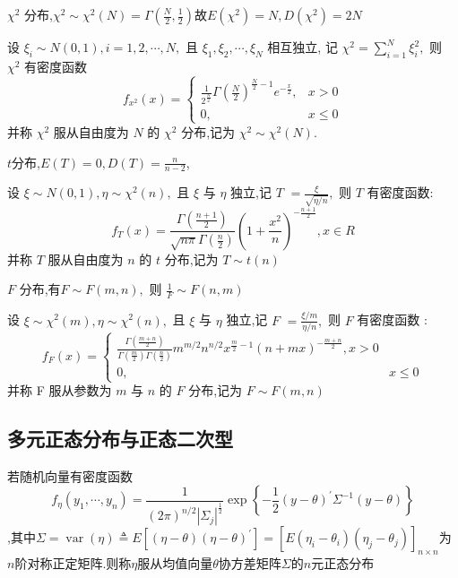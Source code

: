 \documentclass[10pt]{yerbaformat}
\begin{document}
\par $\chi^{2}$ 分布,$\chi^{2} \sim \chi^{2}(N)=\Gamma\left(\frac{N}{2}, \frac{1}{2}\right)$故$E\left(\chi^{2}\right)=N, D\left(\chi^{2}\right)=2 N$
\begin{theorem}
    设 $\xi_{i} \sim N(0,1), i=1,2, \cdots, N,$ 且 $\xi_{1}, \xi_{2}, \cdots, \xi_{N}$
    相互独立, 记 $\chi^{2}=\sum_{i=1}^{N} \xi_{i}^{2},$ 则 $\chi^{2}$ 有密度函数
    $$
        f_{x^{2}}(x)=\left\{\begin{array}{cc}
            \frac{1}{2^{\frac{N}{2}}} \Gamma\left(\frac{N}{2}\right)^{\frac{N}{2}-1} e^{-\frac{x}{2}}, & x>0           \\
            0,                                                                                         & x \leqslant 0
        \end{array}\right.
    $$
    并称 $\chi^{2}$ 服从自由度为 $N$ 的 $\chi^{2}$ 分布,记为 $\chi^{2} \sim \chi^{2}(N) .$
\end{theorem}

\par $t$分布,$E\left(T\right)=0, D\left(T\right)=\frac{n}{n-2}$,
\begin{theorem}
    设 $\xi \sim N(0,1), \eta \sim \chi^{2}(n),$ 且 $\xi$ 与 $\eta$ 独立,记 $T$ $=\frac{\xi}{\sqrt{\eta / n}},$ 则 $T$ 有密度函数:
    $$
        f_{T}(x)=\frac{\Gamma\left(\frac{n+1}{2}\right)}{\sqrt{n \pi} \Gamma\left(\frac{n}{2}\right)}\left(1+\frac{x^{2}}{n}\right)^{-\frac{n+1}{2}}, x \in R
    $$
    并称 $T$ 服从自由度为 $n$ 的 $t$ 分布,记为 $T \sim t(n)$
\end{theorem}

\par $F$ 分布,有$F \sim F(m, n),$ 则 $\frac{1}{F} \sim F(n, m)$
\begin{theorem}
    设 $\xi \sim \chi^{2}(m), \eta \sim \chi^{2}(n),$ 且 $\xi$ 与 $\eta$ 独立,记 $F$
    $=\frac{\xi / m}{\eta / n},$ 则 $F$ 有密度函数 :
    $$f_{F}(x)=\left\{\begin{array}{cc}\frac{\Gamma\left(\frac{m+n}{2}\right)}{\Gamma\left(\frac{m}{2}\right) \Gamma\left(\frac{n}{2}\right)} m^{m / 2} n^{n / 2} x^{\frac{m}{2}-1}(n+m x)^{-\frac{m+n}{2}}, x>0 \\ 0, & x \leqslant 0\end{array}\right.$$
    并称 F 服从参数为 $m$ 与 $n$ 的 $F$ 分布,记为 $F \sim F(m, n)$
\end{theorem}

\subsection{多元正态分布与正态二次型}
\begin{definition}
    若随机向量有密度函数
    $$
        f_{\eta}\left(y_{1}, \cdots, y_{n}\right)=\frac{1}{(2 \pi)^{n / 2}\left|\Sigma_{j}\right|^{\frac{1}{2}}} \exp \left\{-\frac{1}{2}(y-\theta)^{\prime} \Sigma^{-1}(y-\theta)\right\}
    $$,其中$\Sigma=\operatorname{var}(\eta) \triangleq E\left[(\eta-\theta)(\eta-\theta)^{\prime}\right]=\left[E\left(\eta_{i}-\theta_{i}\right)\left(\eta_{j}-\theta_{j}\right)\right]_{n \times n}$为$n$阶对称正定矩阵.则称$\eta$服从均值向量$\theta$协方差矩阵$\Sigma$的$n$元正态分布
\end{definition}
\end{document}

